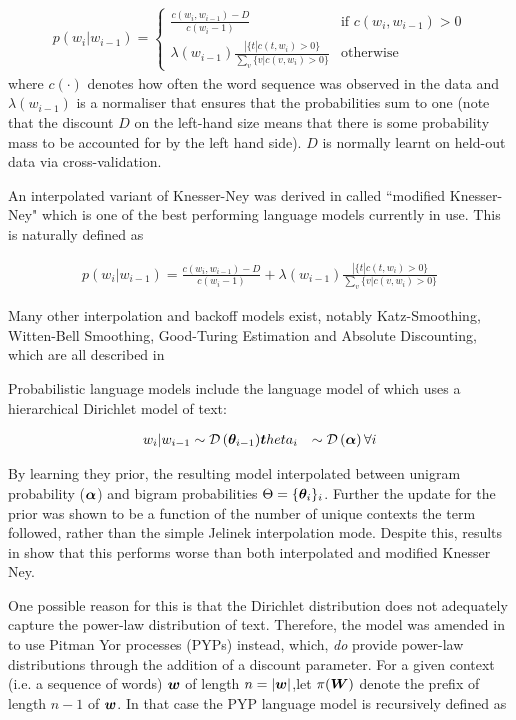 \begin{align}
p(w_i | w_{i-1}) = \left\{ \begin{array}{lr}
     \frac{c(w_i, w_{i-1}) - D}{c(w_i-1)} & \text{if } c(w_i, w_{i-1}) > 0 \\
     \lambda(w_{i-1})\frac{ | \{t | c(t, w_i) > 0\} }{\sum_v \{v | c(v, w_i) > 0\}} & \text{otherwise}
 \end{array}
\right.
\end{align}
where $c(\cdot)$ denotes how often the word sequence was observed in the data and $\lambda(w_{i-1})$ is a normaliser that ensures that the probabilities sum to one (note that the discount $D$ on the left-hand size means that there is some probability mass to be accounted for by the left hand side). $D$ is normally learnt on held-out data via cross-validation.

An interpolated variant of Knesser-Ney was derived in\cite{Goodman2001} called ``modified Knesser-Ney" which is one of the best performing language models currently in use. This is naturally defined as

\begin{align}
p(w_i | w_{i-1}) = \frac{c(w_i, w_{i-1}) - D}{c(w_i-1)} + \lambda(w_{i-1})\frac{ | \{t | c(t, w_i) > 0\} }{\sum_v \{v | c(v, w_i) > 0\}}
\end{align}

Many other interpolation and backoff models exist, notably Katz-Smoothing, Witten-Bell Smoothing, Good-Turing Estimation and Absolute Discounting, which are all described in \cite{Goodman2001}

Probabilistic language models include the language model of \cite{MacKay1995} which uses a hierarchical Dirichlet model of text:

\begin{align}
w_i|w_{i-1} \sim \mathcal{D} \left( {\bm \theta_{i-1}} \right) & \bm theta_i & \sim \mathcal{D} \left( {\bm \alpha} \right) \forall i 
\end{align}

By learning they prior, the resulting model interpolated between unigram probability ($\bm \alpha$) and bigram probabilities $\Theta = \{ \bm \theta_i \}_{i}$. Further the update for the prior was shown to be a function of the number of unique contexts the term followed, rather than the simple Jelinek interpolation mode. Despite this, results in \cite{Teh} show that this performs worse than both interpolated and modified Knesser Ney.

One possible reason for this is that the Dirichlet distribution does not adequately capture the power-law distribution of text. Therefore, the model was amended in \cite{Teh} to use Pitman Yor processes (PYPs) instead, which, \emph{do} provide power-law distributions through the addition of a discount parameter. For a given context (i.e. a sequence of words) $\bm w$ of length $n = |\bm w|$,let $\pi(\bm W)$ denote the prefix of length $n-1$ of $\bm w$. In that case the PYP language model is recursively defined as

